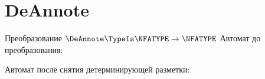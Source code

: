 \section{DeAnnote}
\begin{frame}{Преобразование $\DeAnnote\TypeIs\NFATYPE\to\NFATYPE$}
	Автомат до преобразования:


	Автомат после снятия детерминирующей разметки:


\end{frame}
